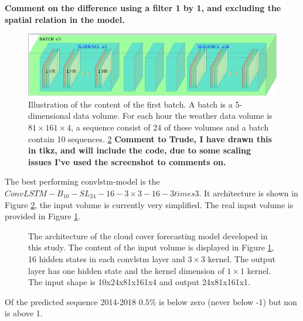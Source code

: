 \textbf{Comment on the difference using a filter 1 by 1, and excluding the spatial relation in the model.}

\begin{figure}
    \centering
    \includegraphics[scale=0.6]{ChapterX_Results_and_Conclusion/computational_experiments/temp_input_volume.png}
    \caption{Illustration of the content of the first batch. A batch is a 5-dimensional data volume. For each hour the weather data volume is $81\times 161\times 4$, a sequence consist of 24 of these volumes and a batch contain 10 sequences. \ref{fig:best_ml_architecture} \textbf{Comment to Trude, I have drawn this in tikz, and will include the code, due to some scaling issues I've used the screenshot to comments on.}}
    \label{fig:input_volume_conv_lstm}
\end{figure}

The best performing \acrshort{convlstm}-model is the $ConvLSTM-B_{10}-SL_{24}-16-3\times3-16-3 times3$. It architecture is shown in Figure \ref{fig:best_ml_architecture}, the input volume is currently very simplified. The real input volume is provided in Figure \ref{fig:input_volume_conv_lstm}. 

\begin{figure}
    \centering
    
    \caption{The architecture of the cloud cover forecasting model developed in this study. The content of the input volume is displayed in Figure \ref{fig:input_volume_conv_lstm}, 16 hidden states in each \acrshort{convlstm} layer and $3\times 3$ kernel. The output layer has one hidden state and the kernel dimension of $1\times 1$ kernel.
    The input shape is 10x24x81x161x4 and output 24x81x161x1.  }
    \label{fig:best_ml_architecture}
\end{figure}

Of the predicted sequence 2014-2018 $0.5\%$ is below zero (never below -1) but non is above 1. %

